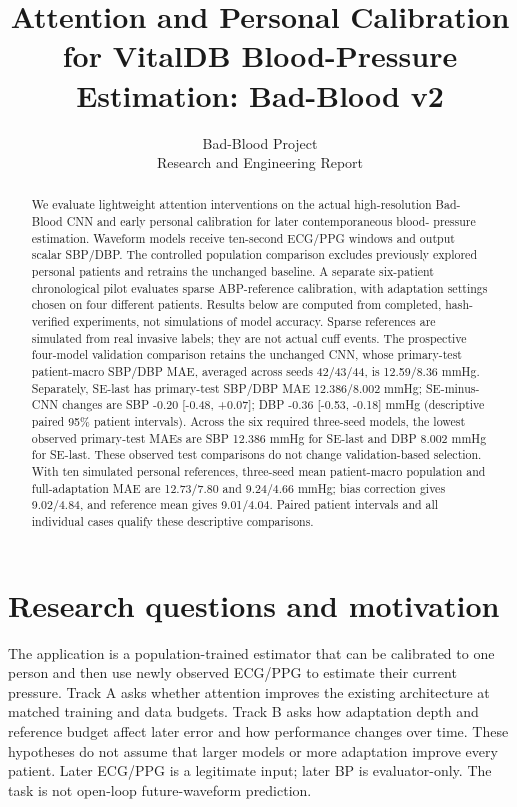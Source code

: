 \documentclass[11pt]{article}
\title{Attention and Personal Calibration for VitalDB Blood-Pressure Estimation: Bad-Blood v2}
\author{Bad-Blood Project\\Research and Engineering Report}
\begin{document}
\maketitle
\begin{abstract}
We evaluate lightweight attention interventions on the actual high-resolution
Bad-Blood CNN and early personal calibration for later contemporaneous blood-
pressure estimation. Waveform models receive ten-second ECG/PPG windows and output
scalar SBP/DBP. The controlled population comparison excludes previously
explored personal patients and retrains the unchanged baseline. A separate
six-patient chronological pilot evaluates sparse ABP-reference calibration,
with adaptation settings chosen on four different patients. Results below
are computed from completed, hash-verified experiments, not simulations of
model accuracy. Sparse references are simulated from real invasive labels;
they are not actual cuff events.
The prospective four-model validation comparison retains the unchanged CNN, whose primary-test patient-macro SBP/DBP MAE, averaged across seeds 42/43/44, is 12.59/8.36 mmHg. Separately, SE-last has primary-test SBP/DBP MAE 12.386/8.002 mmHg; SE-minus-CNN changes are SBP -0.20 [-0.48, +0.07]; DBP -0.36 [-0.53, -0.18] mmHg (descriptive paired 95\% patient intervals). Across the six required three-seed models, the lowest observed primary-test MAEs are SBP 12.386 mmHg for SE-last and DBP 8.002 mmHg for SE-last. These observed test comparisons do not change validation-based selection. With ten simulated personal references, three-seed mean patient-macro population and full-adaptation MAE are 12.73/7.80 and 9.24/4.66 mmHg; bias correction gives 9.02/4.84, and reference mean gives 9.01/4.04. Paired patient intervals and all individual cases qualify these descriptive comparisons.

\end{abstract}
\section{Research questions and motivation}
The application is a population-trained estimator that can be calibrated to
one person and then use newly observed ECG/PPG to estimate their current
pressure. Track A asks whether attention improves the existing architecture
at matched training and data budgets. Track B asks how adaptation depth and
reference budget affect later error and how performance changes over time.
These hypotheses do not assume that larger models or more adaptation improve
every patient. Later ECG/PPG is a legitimate input; later BP is evaluator-only.
The task is not open-loop future-waveform prediction.
\end{document}
